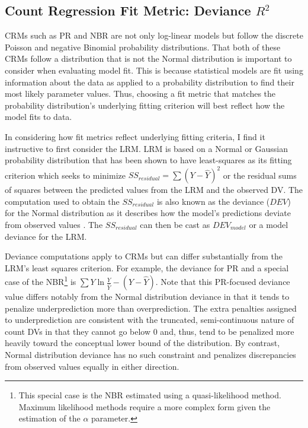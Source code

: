\documentclass[ShortAfour,times,sageapa]{sagej}
\begin{document}
	\subsection{Count Regression Fit Metric: Deviance $R^2$}
	
	CRMs such as PR and NBR are not only log-linear models but follow the discrete Poisson and negative Binomial probability distributions.
	That both of these CRMs follow a distribution that is not the Normal distribution is important to consider when evaluating model fit.
	This is because statistical models are fit using information about the data as applied to a probability distribution to find their most likely parameter values.
	Thus, choosing a fit metric that matches the probability distribution's underlying fitting criterion will best reflect how the model fits to data.
	
	In considering how fit metrics reflect underlying fitting criteria, I find it instructive to first consider the LRM.
	LRM is based on a Normal or Gaussian probability distribution that has been shown to have least-squares as its fitting criterion which seeks to minimize $SS_{residual} = \sum (Y - \hat{Y})^2$ or the residual sums of squares between the predicted values from the LRM and the observed DV. The computation used to obtain the $SS_{residual}$ is also known as the deviance ($DEV$) for the Normal distribution as it describes how the model's predictions deviate from observed values \cite{mccullagh2019generalized}.
	The $SS_{residual}$ can then be cast as $DEV_{model}$ or a model deviance for the LRM.
	
	Deviance computations apply to CRMs but can differ substantially from the LRM's least squares criterion.
	For example, the deviance for PR and a special case of the NBR\footnote{
		This special case is the NBR estimated using a quasi-likelihood method. 
		Maximum likelihood methods require a more complex form given the estimation of the $\alpha$ parameter.} 
	is $\sum Y\ln \frac{Y}{\hat{Y}} - (Y - \hat{Y})$. 
	Note that this PR-focused deviance value differs notably from the Normal distribution deviance in that it tends to penalize underprediction more than overprediction.
	The extra penalties assigned to underprediction are consistent with the truncated, semi-continuous nature of count DVs in that they cannot go below 0 and, thus, tend to be penalized more heavily toward the conceptual lower bound of the distribution.
	By contrast, Normal distribution deviance has no such constraint and penalizes discrepancies from observed values equally in either direction.
	
\end{document}

